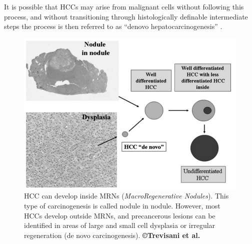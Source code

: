 \documentclass[]{article}
\begin{document}
It is possible that HCCs may arise from malignant cells without
following this process, and without transitioning through histologically
definable intermediate steps the process is then referred to as ``denovo
hepatocarcinogenesis'' \cite{Taguchi2002}.


\begin{figure}[th!]
\centering
\includegraphics[width=0.7\linewidth]{images/image3}
\caption{HCC can develop inside MRNs (\emph{MacroRegenerative Nodules}). This type of carcinogenesis is called nodule in nodule. However, most HCCs develop outside MRNs, and precancerous lesions can be identified in areas of large and small cell dysplasia or irregular regeneration (de novo carcinogenesis). \textbf{©Trevisani et al. \cite{Trevisani2008a}}}
\label{Trevisani2008_Fig2}
\end{figure}
\end{document}
